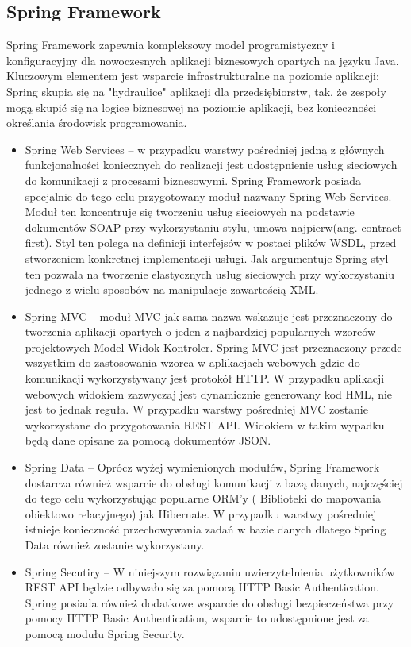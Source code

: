 \subsection{Spring Framework  }
Spring Framework zapewnia kompleksowy model programistyczny i konfiguracyjny dla nowoczesnych aplikacji biznesowych opartych na języku Java. Kluczowym elementem jest wsparcie infrastrukturalne  na poziomie aplikacji: Spring skupia się na "hydraulice" aplikacji dla przedsiębiorstw, tak, że zespoły mogą skupić się na logice biznesowej na poziomie aplikacji, bez konieczności określania środowisk programowania. ~\cite{springFramework}

\begin{itemize}

\item Spring Web Services  -- w przypadku warstwy pośredniej jedną z głównych funkcjonalności koniecznych do realizacji jest udostępnienie usług sieciowych do komunikacji z procesami biznesowymi. Spring Framework posiada specjalnie do tego celu przygotowany moduł nazwany Spring Web Services. Moduł ten koncentruje się tworzeniu usług sieciowych na podstawie dokumentów SOAP przy wykorzystaniu stylu, umowa-najpierw(ang. contract-first). Styl ten polega na definicji interfejsów w postaci plików WSDL, przed stworzeniem konkretnej implementacji usługi. Jak argumentuje Spring styl ten pozwala na tworzenie elastycznych usług sieciowych przy wykorzystaniu jednego z wielu sposobów na manipulacje zawartością XML.  ~\cite{springWS}

\item Spring MVC -- moduł MVC jak sama nazwa wskazuje jest przeznaczony do tworzenia aplikacji opartych o jeden z najbardziej popularnych wzorców projektowych Model Widok Kontroler. Spring MVC jest przeznaczony przede wszystkim do zastosowania wzorca w aplikacjach webowych gdzie do komunikacji wykorzystywany jest protokół HTTP. W przypadku aplikacji webowych widokiem zazwyczaj jest dynamicznie generowany kod HML, nie jest to jednak reguła. W przypadku warstwy pośredniej MVC zostanie wykorzystane do przygotowania REST API. Widokiem w takim wypadku będą dane opisane za pomocą dokumentów JSON. 

\item Spring Data -- Oprócz wyżej wymienionych modułów, Spring Framework dostarcza również wsparcie do obsługi komunikacji z bazą danych, najczęściej do tego celu wykorzystując popularne ORM'y ( Biblioteki do mapowania obiektowo relacyjnego) jak Hibernate. W przypadku warstwy pośredniej istnieje konieczność przechowywania zadań w bazie danych dlatego Spring Data również zostanie wykorzystany.

\item Spring Secutiry -- W niniejszym rozwiązaniu uwierzytelnienia użytkowników REST API będzie odbywało się za pomocą HTTP Basic Authentication. Spring posiada również dodatkowe wsparcie do obsługi bezpieczeństwa przy pomocy HTTP Basic Authentication, wsparcie to udostępnione jest za pomocą modułu Spring Security.   

\end{itemize}

